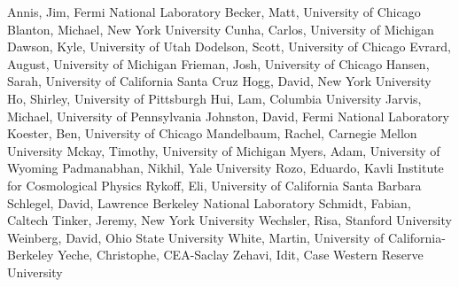 Annis, Jim, Fermi National Laboratory \newline
Becker, Matt, University of Chicago \newline
Blanton, Michael, New York University \newline
Cunha, Carlos, University of Michigan \newline
Dawson, Kyle, University of Utah \newline
Dodelson, Scott, University of Chicago \newline
Evrard, August, University of Michigan \newline
Frieman, Josh, University of Chicago \newline
Hansen, Sarah, University of California Santa Cruz \newline
Hogg, David, New York University \newline
Ho, Shirley, University of Pittsburgh \newline
Hui, Lam, Columbia University \newline
Jarvis, Michael, University of Pennsylvania \newline
Johnston, David, Fermi National Laboratory \newline
Koester, Ben, University of Chicago \newline
Mandelbaum, Rachel,  Carnegie Mellon University \newline
Mckay, Timothy, University of Michigan \newline
Myers, Adam, University of Wyoming \newline
Padmanabhan, Nikhil, Yale University \newline
Rozo, Eduardo, Kavli Institute for Cosmological Physics \newline
Rykoff, Eli, University of California Santa Barbara \newline
Schlegel, David, Lawrence Berkeley National Laboratory \newline
Schmidt, Fabian, Caltech \newline
Tinker, Jeremy, New York University \newline
Wechsler, Risa, Stanford University \newline
Weinberg, David, Ohio State University \newline
White, Martin, University of California-Berkeley \newline
Yeche, Christophe, CEA-Saclay \newline
Zehavi, Idit, Case Western Reserve University \newline
